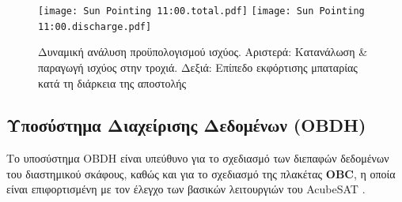 \documentclass[a4paper,nobib]{tufte-book}
\begin{document}
\FloatBarrier

\begin{figure}[h]
	\texttt{[image: Sun Pointing 11:00.total.pdf]}
	\hfill
	\texttt{[image: Sun Pointing 11:00.discharge.pdf]}

	\caption[Δυναμική ανάλυση προϋπολογισμού ισχύος]{Δυναμική ανάλυση προϋπολογισμού ισχύος. Αριστερά: Κατανάλωση \& παραγωγή ισχύος στην τροχιά. Δεξιά: Επίπεδο εκφόρτισης μπαταρίας κατά τη διάρκεια της αποστολής}
\end{figure}

\subsection{Υποσύστημα Διαχείρισης Δεδομένων (\acs{OBDH})}
\label{sec:obdh}

Το υποσύστημα \ac{OBDH} είναι υπεύθυνο για το σχεδιασμό των διεπαφών δεδομένων του διαστημικού σκάφους, καθώς και για το σχεδιασμό της πλακέτας \textbf{\acf{OBC}}, η οποία είναι επιφορτισμένη με τον έλεγχο των βασικών λειτουργιών του AcubeSAT \autocite{DDJF_OBDH}.
\end{document}
